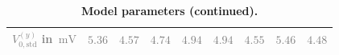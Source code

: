 \documentclass[10pt,a4paper,twoside,american]{article}
\theoremstyle{definitionstyle}
\newcommand{\mV}{\,\text{mV}}
\newcommand{\drvd}[1]{\textcolor{gray}{#1}} %
\begin{document}
\begin{table}[H]
\begin{tabular}
{\begin{tabular}{|p{14ex}|>{\raggedleft}p{7ex}|>{\raggedleft}p{7ex}|>{\raggedleft}p{7ex}|>{\raggedleft}p{7ex}|>{\raggedleft}p{7ex}|>{\raggedleft}p{7ex}|>{\raggedleft}p{7ex}|>{\raggedleft\arraybackslash}p{7ex}|}
        \hline
	\vspace{-1ex} \drvd{$V_{0, \text{std}}^{(y)}$ in $\mV$} & \vspace{-1ex} \drvd{$5.36$} & \vspace{-1ex} \drvd{$4.57$} & \vspace{-1ex} \drvd{$4.74$} & \vspace{-1ex} \drvd{$4.94$} & \vspace{-1ex} \drvd{$4.94$} & \vspace{-1ex} \drvd{$4.55$} & \vspace{-1ex} \drvd{$5.46$} & \vspace{-1ex} \drvd{$4.48$}\\
        \hline
\end{tabular}
}\\
\\
\hline
\end{tabular}

\caption{\bf Model parameters (continued).}
\end{table}

\newpage


\appendix
\end{document}
